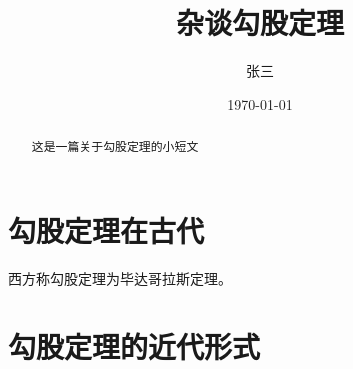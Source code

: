 \documentclass[UTF8]{ctexart}
\title{杂谈勾股定理}
\author{张三}
\date{\today}
\begin{document}
\maketitle
\begin{abstract}
这是一篇关于勾股定理的小短文
\end{abstract}
\tableofcontents
\section{勾股定理在古代}
西方称勾股定理为毕达哥拉斯定理。

\section{勾股定理的近代形式}

\end{document}
